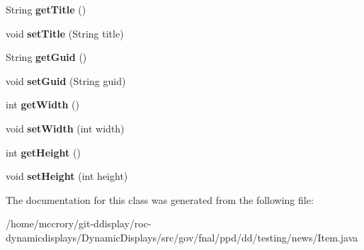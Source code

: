 \begin{DoxyCompactItemize}
\item 
\hypertarget{classgov_1_1fnal_1_1ppd_1_1dd_1_1testing_1_1news_1_1Item_aff117a57502c01fe147fd376ab26fea3}{String {\bfseries get\-Title} ()}\label{classgov_1_1fnal_1_1ppd_1_1dd_1_1testing_1_1news_1_1Item_aff117a57502c01fe147fd376ab26fea3}

\item 
\hypertarget{classgov_1_1fnal_1_1ppd_1_1dd_1_1testing_1_1news_1_1Item_a8092b2d5e061917b3897a612b22eedad}{void {\bfseries set\-Title} (String title)}\label{classgov_1_1fnal_1_1ppd_1_1dd_1_1testing_1_1news_1_1Item_a8092b2d5e061917b3897a612b22eedad}

\item 
\hypertarget{classgov_1_1fnal_1_1ppd_1_1dd_1_1testing_1_1news_1_1Item_a7b0b9adf9d55c102c88d2c55091ece53}{String {\bfseries get\-Guid} ()}\label{classgov_1_1fnal_1_1ppd_1_1dd_1_1testing_1_1news_1_1Item_a7b0b9adf9d55c102c88d2c55091ece53}

\item 
\hypertarget{classgov_1_1fnal_1_1ppd_1_1dd_1_1testing_1_1news_1_1Item_abc27190e26d3a648b0ead060a2395983}{void {\bfseries set\-Guid} (String guid)}\label{classgov_1_1fnal_1_1ppd_1_1dd_1_1testing_1_1news_1_1Item_abc27190e26d3a648b0ead060a2395983}

\item 
\hypertarget{classgov_1_1fnal_1_1ppd_1_1dd_1_1testing_1_1news_1_1Item_a854ded5e869a375cb8e090277b4f8f41}{int {\bfseries get\-Width} ()}\label{classgov_1_1fnal_1_1ppd_1_1dd_1_1testing_1_1news_1_1Item_a854ded5e869a375cb8e090277b4f8f41}

\item 
\hypertarget{classgov_1_1fnal_1_1ppd_1_1dd_1_1testing_1_1news_1_1Item_af2853fd69ff55aae7d2a7d133307765e}{void {\bfseries set\-Width} (int width)}\label{classgov_1_1fnal_1_1ppd_1_1dd_1_1testing_1_1news_1_1Item_af2853fd69ff55aae7d2a7d133307765e}

\item 
\hypertarget{classgov_1_1fnal_1_1ppd_1_1dd_1_1testing_1_1news_1_1Item_a66dbc074049a62ce0ac49de6f7a2c335}{int {\bfseries get\-Height} ()}\label{classgov_1_1fnal_1_1ppd_1_1dd_1_1testing_1_1news_1_1Item_a66dbc074049a62ce0ac49de6f7a2c335}

\item 
\hypertarget{classgov_1_1fnal_1_1ppd_1_1dd_1_1testing_1_1news_1_1Item_a6817f6e0074446f56bafffa4d288050b}{void {\bfseries set\-Height} (int height)}\label{classgov_1_1fnal_1_1ppd_1_1dd_1_1testing_1_1news_1_1Item_a6817f6e0074446f56bafffa4d288050b}

\end{DoxyCompactItemize}


The documentation for this class was generated from the following file\-:\begin{DoxyCompactItemize}
\item 
/home/mccrory/git-\/ddisplay/roc-\/dynamicdisplays/\-Dynamic\-Displays/src/gov/fnal/ppd/dd/testing/news/Item.\-java\end{DoxyCompactItemize}
